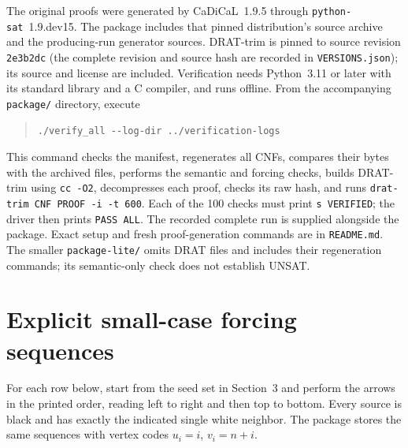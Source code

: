 \documentclass[10pt,a4paper]{article}
\begin{document}
The original proofs were generated by CaDiCaL~1.9.5 through
\texttt{python-sat}~1.9.dev15. The package includes that pinned distribution's
source archive and the producing-run generator sources. DRAT-trim is pinned
to source revision \texttt{2e3b2dc} (the complete revision and source hash
are recorded in \texttt{VERSIONS.json}); its source and license are included.
Verification needs Python~3.11 or later with its standard library and a C
compiler, and runs offline. From the accompanying \texttt{package/} directory,
execute
\begin{quote}
\verb|./verify_all --log-dir ../verification-logs|
\end{quote}
This command checks the manifest, regenerates all CNFs, compares their bytes
with the archived files, performs the semantic and forcing checks, builds
DRAT-trim using \texttt{cc -O2}, decompresses each proof, checks its raw hash,
and runs \texttt{drat-trim CNF PROOF -i -t 600}. Each of the 100 checks must
print \texttt{s VERIFIED}; the driver then prints \texttt{PASS ALL}.
The recorded complete run is supplied alongside the package. Exact setup
and fresh proof-generation commands are in \texttt{README.md}. The smaller
\texttt{package-lite/} omits DRAT files and includes their regeneration
commands; its semantic-only check does not establish UNSAT.

\appendix
\section{Explicit small-case forcing sequences}\label{sequences}
For each row below, start from the seed set in Section~3 and perform the
arrows in the printed order, reading left to right and then top to bottom.
Every source is black and has exactly the indicated single white neighbor.
The package stores the same sequences with vertex codes $u_i=i$, $v_i=n+i$.
\end{document}
